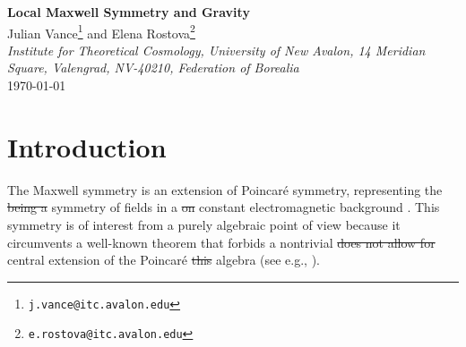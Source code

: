 \documentclass[11pt, a4paper]{article}
\newcommand{\lang}[1]{\textcolor{langfix}{#1}}
\newcommand{\subst}[1]{\textcolor{substantive}{#1}}
\newcommand{\rem}[1]{\textcolor{removeprop}{\sout{#1}}}
\def\SO{\mathsf{SO}}
\begin{document}
\begin{center}
{\LARGE \textbf{Local Maxwell Symmetry and Gravity}}\\[1em]
{\large Julian Vance\footnote{\texttt{j.vance@itc.avalon.edu}} and Elena Rostova\footnote{\texttt{e.rostova@itc.avalon.edu}}}\\[0.4em]
{\small \textit{Institute for Theoretical Cosmology, University of New Avalon, 14 Meridian Square, Valengrad, NV-40210, Federation of Borealia}}\\[0.4em]
{\small \today}
\end{center}

\vspace{0.8em}

\begin{abstract}\noindent
In this paper we discuss \rem{some} physical aspects of a theory obtained by gauging the AdS-Maxwell symmetry. \lang{This} \rem{Such} theory has the form of Einstein gravity coupled to \lang{an} \rem{the} $\SO(3,1)$ Yang--Mills field. We notice that there is another tetrad field, which can be associated with \lang{a} linear combination of \lang{the} Lorentz and Maxwell connections. Taking this tetrad as a fundamental variable makes it possible to cast the theory into the form of $f$--$g$ gravity \lang{in the} \rem{in} first-order formulation. Finally, we discuss a simple cosmological model derived from AdS-Maxwell gravity\subst{, obtain an exact analytical family of solutions in terms of Jacobi elliptic functions, and analyze the general coupled system numerically}.
\end{abstract}

\section{Introduction}

The Maxwell symmetry is an extension of Poincar\'e symmetry, \lang{representing the} \rem{being a} symmetry of fields \lang{in a} \rem{on} constant electromagnetic background \cite{Bacry:1970ye, Schrader:1972zd}. This symmetry is of interest from \lang{a} purely algebraic point of view because it circumvents a well-known theorem that \lang{forbids a nontrivial} \rem{does not allow for} central extension of \lang{the Poincar\'e} \rem{this} algebra (see e.g., \cite{Galindo:1967, Soroka:2011tc, Gomis:2009dm}).
\end{document}
